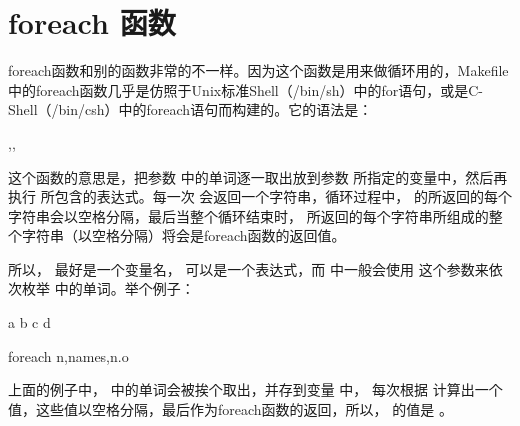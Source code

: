 \documentclass[a4paper,10pt]{sphinxmanual}
\begin{document}
\section{foreach 函数}
\label{\detokenize{functions:foreach}}
foreach函数和别的函数非常的不一样。因为这个函数是用来做循环用的，Makefile中的foreach函数几乎是仿照于Unix标准Shell（/bin/sh）中的for语句，或是C-Shell（/bin/csh）中的foreach语句而构建的。它的语法是：

\begin{sphinxVerbatim}[commandchars=\\\{\}]
 \PYGZlt{}\PYGZgt{},\PYGZlt{}\PYGZgt{},\PYGZlt{}\PYGZgt{}
\end{sphinxVerbatim}

这个函数的意思是，把参数  中的单词逐一取出放到参数  所指定的变量中，然后再执行  所包含的表达式。每一次  会返回一个字符串，循环过程中，
 的所返回的每个字符串会以空格分隔，最后当整个循环结束时，  所返回的每个字符串所组成的整个字符串（以空格分隔）将会是foreach函数的返回值。

所以，  最好是一个变量名，  可以是一个表达式，而  中一般会使用  这个参数来依次枚举  中的单词。举个例子：

\begin{sphinxVerbatim}[commandchars=\\\{\}]
  a b c d

  foreach n,names,n.o
\end{sphinxVerbatim}

上面的例子中，  中的单词会被挨个取出，并存到变量  中，  每次根据  计算出一个值，这些值以空格分隔，最后作为foreach函数的返回，所以， 
的值是  。
\end{document}
